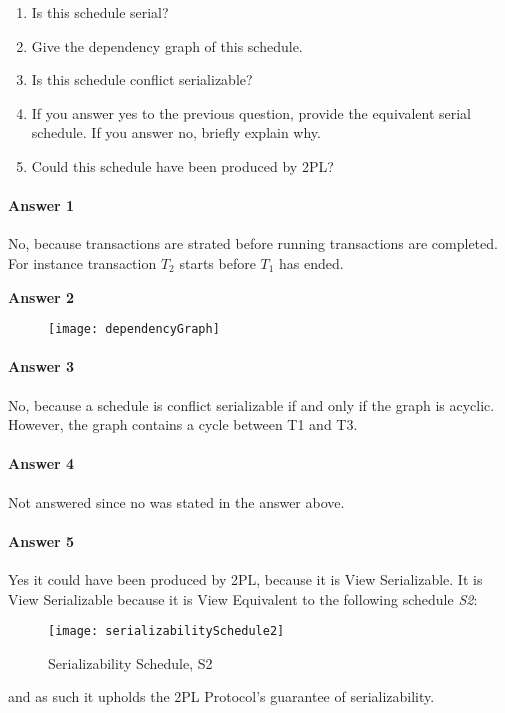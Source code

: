 \begin{enumerate}
	\item Is this schedule serial?
	\item  Give the dependency graph of this schedule.
	\item Is this schedule conﬂict serializable?
	\item  If you answer yes to the previous question, provide the equivalent serial schedule. If you answer no, brieﬂy explain why.
	\item Could this schedule have been produced by 2PL?
\end{enumerate}

\paragraph{Answer 1}
	No, because transactions are strated before running transactions are completed. For instance transaction $T_2$ starts before $T_1$ has ended.
\pagebreak

\textbf{Answer 2}
\begin{figure}[H]
	\texttt{[image: dependencyGraph]}
	\label{Dependency Graph}
\end{figure}

\paragraph{Answer 3}
	No, because a schedule is conflict serializable if and only if the graph is acyclic. However, the graph contains a cycle between T1 and T3.
\paragraph{Answer 4}
	Not answered since no was stated in the answer above.
\paragraph{Answer 5}
	Yes it could have been produced by 2PL, because it is View Serializable. It is View Serializable because it is View Equivalent to the following schedule \textit{S2}:
	\begin{figure}[H]
	\texttt{[image: serializabilitySchedule2]}
	\caption{Serializability Schedule, S2}
	\label{Serializability Schedule, S2}
\end{figure}
 and as such it upholds the 2PL Protocol's guarantee of serializability. 